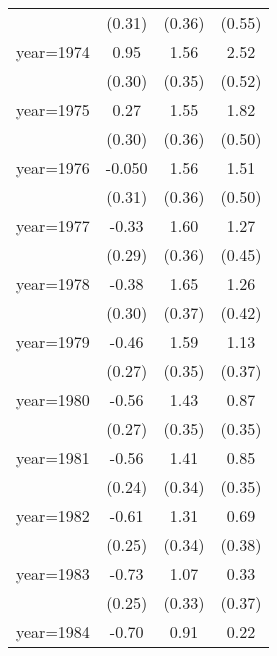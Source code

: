 \begin{sidewaystable}[htbp]
\begin{tabular}{l*{3}{c}}
                &   (0.31)         &   (0.36)         &   (0.55)         \\
\addlinespace
year=1974       &     0.95\sym{***}&     1.56\sym{***}&     2.52\sym{***}\\
                &   (0.30)         &   (0.35)         &   (0.52)         \\
\addlinespace
year=1975       &     0.27         &     1.55\sym{***}&     1.82\sym{***}\\
                &   (0.30)         &   (0.36)         &   (0.50)         \\
\addlinespace
year=1976       &   -0.050         &     1.56\sym{***}&     1.51\sym{***}\\
                &   (0.31)         &   (0.36)         &   (0.50)         \\
\addlinespace
year=1977       &    -0.33         &     1.60\sym{***}&     1.27\sym{***}\\
                &   (0.29)         &   (0.36)         &   (0.45)         \\
\addlinespace
year=1978       &    -0.38         &     1.65\sym{***}&     1.26\sym{***}\\
                &   (0.30)         &   (0.37)         &   (0.42)         \\
\addlinespace
year=1979       &    -0.46\sym{*}  &     1.59\sym{***}&     1.13\sym{***}\\
                &   (0.27)         &   (0.35)         &   (0.37)         \\
\addlinespace
year=1980       &    -0.56\sym{**} &     1.43\sym{***}&     0.87\sym{**} \\
                &   (0.27)         &   (0.35)         &   (0.35)         \\
\addlinespace
year=1981       &    -0.56\sym{**} &     1.41\sym{***}&     0.85\sym{**} \\
                &   (0.24)         &   (0.34)         &   (0.35)         \\
\addlinespace
year=1982       &    -0.61\sym{**} &     1.31\sym{***}&     0.69\sym{*}  \\
                &   (0.25)         &   (0.34)         &   (0.38)         \\
\addlinespace
year=1983       &    -0.73\sym{***}&     1.07\sym{***}&     0.33         \\
                &   (0.25)         &   (0.33)         &   (0.37)         \\
\addlinespace
year=1984       &    -0.70\sym{***}&     0.91\sym{***}&     0.22         \\

\end{tabular}
\end{sidewaystable}

